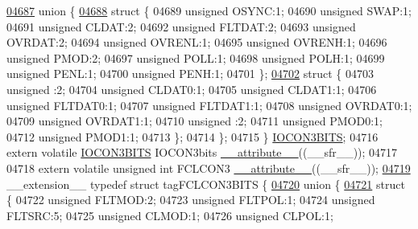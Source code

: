 \begin{DoxyCode}
\hypertarget{a00009_source_l04687}{}\hyperlink{a00009}{04687}   \textcolor{keyword}{union }\{
\hypertarget{a00009_source_l04688}{}\hyperlink{a00009}{04688}     \textcolor{keyword}{struct }\{
04689       \textcolor{keywordtype}{unsigned} OSYNC:1;
04690       \textcolor{keywordtype}{unsigned} SWAP:1;
04691       \textcolor{keywordtype}{unsigned} CLDAT:2;
04692       \textcolor{keywordtype}{unsigned} FLTDAT:2;
04693       \textcolor{keywordtype}{unsigned} OVRDAT:2;
04694       \textcolor{keywordtype}{unsigned} OVRENL:1;
04695       \textcolor{keywordtype}{unsigned} OVRENH:1;
04696       \textcolor{keywordtype}{unsigned} PMOD:2;
04697       \textcolor{keywordtype}{unsigned} POLL:1;
04698       \textcolor{keywordtype}{unsigned} POLH:1;
04699       \textcolor{keywordtype}{unsigned} PENL:1;
04700       \textcolor{keywordtype}{unsigned} PENH:1;
04701     \};
\hypertarget{a00009_source_l04702}{}\hyperlink{a00009}{04702}     \textcolor{keyword}{struct }\{
04703       \textcolor{keywordtype}{unsigned} :2;
04704       \textcolor{keywordtype}{unsigned} CLDAT0:1;
04705       \textcolor{keywordtype}{unsigned} CLDAT1:1;
04706       \textcolor{keywordtype}{unsigned} FLTDAT0:1;
04707       \textcolor{keywordtype}{unsigned} FLTDAT1:1;
04708       \textcolor{keywordtype}{unsigned} OVRDAT0:1;
04709       \textcolor{keywordtype}{unsigned} OVRDAT1:1;
04710       \textcolor{keywordtype}{unsigned} :2;
04711       \textcolor{keywordtype}{unsigned} PMOD0:1;
04712       \textcolor{keywordtype}{unsigned} PMOD1:1;
04713     \};
04714   \};
04715 \} \hyperlink{a00008_d6/d52/a00510}{IOCON3BITS};
04716 \textcolor{keyword}{extern} \textcolor{keyword}{volatile} \hyperlink{a00008_d6/d52/a00510}{IOCON3BITS} IOCON3bits \hyperlink{a00009_a493c46f03454991ccc5aa7a6e1dfb2a7}{\_\_attribute\_\_}((\_\_sfr\_\_));
04717 
04718 \textcolor{keyword}{extern} \textcolor{keyword}{volatile} \textcolor{keywordtype}{unsigned} \textcolor{keywordtype}{int}  FCLCON3 \hyperlink{a00009_a493c46f03454991ccc5aa7a6e1dfb2a7}{\_\_attribute\_\_}((\_\_sfr\_\_));
\hypertarget{a00009_source_l04719}{}\hyperlink{a00008}{04719} \_\_extension\_\_ \textcolor{keyword}{typedef} \textcolor{keyword}{struct }tagFCLCON3BITS \{
\hypertarget{a00009_source_l04720}{}\hyperlink{a00009}{04720}   \textcolor{keyword}{union }\{
\hypertarget{a00009_source_l04721}{}\hyperlink{a00009}{04721}     \textcolor{keyword}{struct }\{
04722       \textcolor{keywordtype}{unsigned} FLTMOD:2;
04723       \textcolor{keywordtype}{unsigned} FLTPOL:1;
04724       \textcolor{keywordtype}{unsigned} FLTSRC:5;
04725       \textcolor{keywordtype}{unsigned} CLMOD:1;
04726       \textcolor{keywordtype}{unsigned} CLPOL:1;

\end{DoxyCode}

